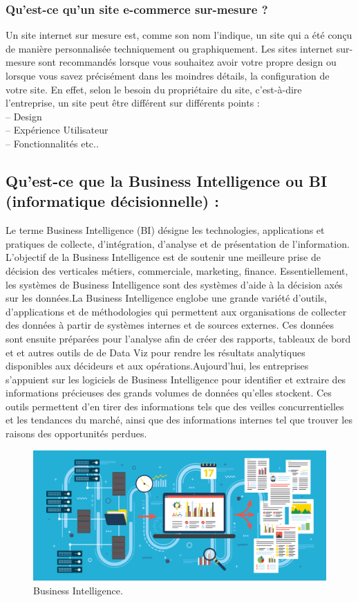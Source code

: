 \documentclass[a4paper, 12pt]{report}
\begin{document}
\subsubsection{Qu’est-ce qu’un site e-commerce sur-mesure ?}
Un site internet sur mesure est, comme son nom l'indique, un site qui a été conçu de manière personnalisée techniquement ou graphiquement. Les sites internet sur-mesure sont recommandés lorsque vous souhaitez avoir votre propre design ou lorsque vous savez précisément dans les moindres détails, la configuration de votre site. En effet, selon le besoin du propriétaire du site, c'est-à-dire l'entreprise, un site peut être différent sur différents points :\\
-- Design\\
-- Expérience Utilisateur\\
-- Fonctionnalités etc..\\
\subsection{Qu’est-ce que la Business Intelligence ou BI (informatique décisionnelle) : }
Le terme Business Intelligence (BI) désigne les technologies, applications et pratiques de collecte, d'intégration, d'analyse et de présentation de l'information. L'objectif de la Business Intelligence est de soutenir une meilleure prise de décision des verticales métiers, commerciale, marketing, finance. Essentiellement, les systèmes de Business Intelligence sont des systèmes d'aide à la décision axés sur les données.La Business Intelligence englobe une grande variété d'outils, d'applications et de méthodologies qui permettent aux organisations de collecter des données à partir de systèmes internes et de sources externes. Ces données sont ensuite préparées pour l'analyse afin de créer des rapports, tableaux de bord et et autres outils de de Data Viz pour rendre les résultats analytiques disponibles aux décideurs et aux opérations.Aujourd'hui, les entreprises s'appuient sur les logiciels de Business Intelligence pour identifier et extraire des informations précieuses des grands volumes de données qu'elles stockent. Ces outils permettent d’en tirer des informations tels que des veilles concurrentielles et les tendances du marché, ainsi que des informations internes tel que trouver les raisons des opportunités perdues.
\begin{figure}[H]
    \centering
    \includegraphics[width = 1\linewidth]{img/business-intelligence-4-01.png}
    \caption{Business Intelligence.}
\end{figure}\cite{bi}
\end{document}
